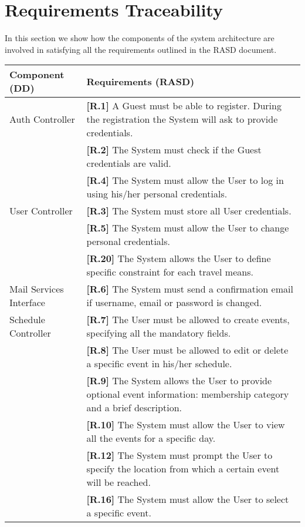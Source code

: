 \section{Requirements Traceability}

In this section we show how the components of the system architecture are involved in satisfying all the requirements outlined in the RASD document.

\begin{table}[h!]
	\centering
	\footnotesize
	\begin{tabularx}{\textwidth}{@{}lX@{}}
		\toprule
		\textbf{Component (DD)} & \textbf{Requirements (RASD)}\\	
		\midrule
		Auth Controller & \textbf{[R.1]} A Guest must be able to register. During the registration
		the System will ask to provide credentials.\\
		& \textbf{[R.2]} The System must check if the Guest credentials are valid. \\
		& \textbf{[R.4]} The System must allow the User to log in using his/her
		personal credentials.\\
		\midrule
		User Controller & \textbf{[R.3]} The System must store all User credentials. \\
		& \textbf{[R.5]} The System must allow the User to change personal credentials. \\
		& \textbf{[R.20]} The System allows the User to define specific constraint for each travel means. \\
		\midrule
		Mail Services Interface & \textbf{[R.6]} The System must send a confirmation email if username, email or password is changed.\\
		\midrule
		Schedule Controller & \textbf{[R.7]} The User must be allowed to create events, specifying all the mandatory fields.\\
		& \textbf{[R.8]} The User must be allowed to edit or delete a specific event in his/her schedule. \\
		& \textbf{[R.9]} The System allows the User to provide optional event information: membership category and a brief description. \\
		& \textbf{[R.10]} The System must allow the User to view all the events for a specific day.\\
		& \textbf{[R.12]} The System must prompt the User to specify the location from which a certain event will be reached. \\
		& \textbf{[R.16]} The System must allow the User to select a specific event.\\

\end{tabularx}
\end{table}
